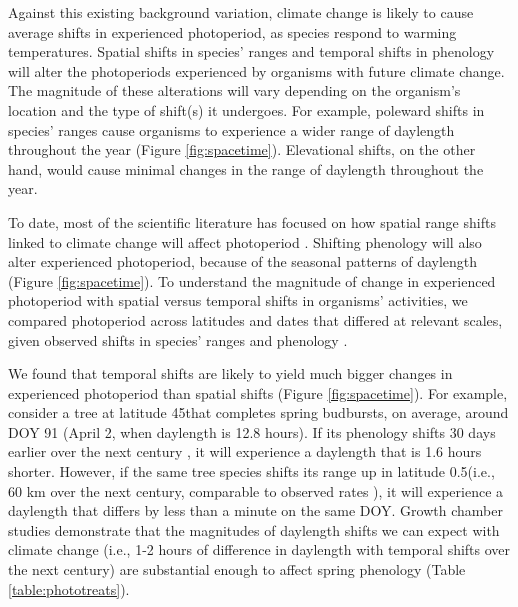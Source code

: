 \documentclass{article}
\begin{document}
\par Against this existing background variation, climate change is likely to cause average shifts in experienced photoperiod, as species respond to warming temperatures. Spatial shifts in species' ranges and temporal shifts in phenology will alter the photoperiods experienced by organisms with future climate change. The magnitude of these alterations will vary depending on the organism's location and the type of shift(s) it undergoes. For example, poleward shifts in species' ranges cause organisms to experience a wider range of daylength throughout the year (Figure \ref{fig:spacetime}). Elevational shifts, on the other hand, would cause minimal changes in the range of daylength throughout the year. %
\par To date, most of the scientific literature has focused on how spatial range shifts linked to climate change will affect photoperiod \citep[e.g.,] []{saikkonen2012, way2014}. Shifting phenology will also alter experienced photoperiod, because of the seasonal patterns of daylength (Figure \ref{fig:spacetime}). To understand the magnitude of change in experienced photoperiod with spatial versus temporal shifts in organisms' activities, we compared photoperiod across latitudes and dates that differed at relevant scales, given observed shifts in species' ranges and phenology \citep{parmesan2003,chen2011}.  
\par We found that temporal shifts are likely to yield much bigger changes in experienced photoperiod than spatial shifts (Figure \ref{fig:spacetime}). For example, consider a tree at latitude 45\degree that completes spring budbursts, on average, around DOY 91 (April 2, when daylength is 12.8 hours). If its phenology shifts 30 days earlier over the next century \citep[][i.e., a rate of ~3 days per decade, as has been observed]{parmesan2003}, it will experience a daylength that is 1.6 hours shorter. However, if the same tree species shifts its range up in latitude 0.5\degree (i.e., 60 km over the next century,  comparable to observed rates \citep{parmesan2003, chen2011}), it will experience a daylength that differs by less than a minute on the same DOY. Growth chamber studies demonstrate that the magnitudes of daylength shifts we can expect with climate change (i.e., 1-2 hours of difference in daylength with temporal shifts over the next century) are substantial enough to affect spring phenology (Table \ref{table:phototreats}).  
\end{document}

